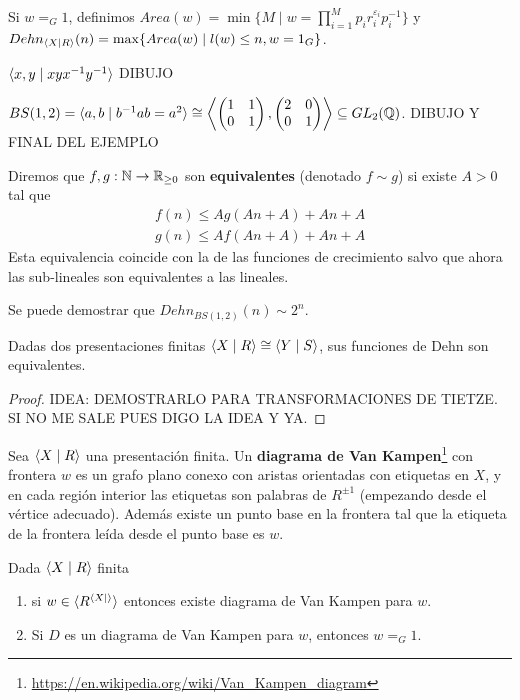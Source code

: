 \documentclass[twoside, 11pt]{article}
\begin{document}
Si $w=_G 1$, definimos $Area(w)=\min\{M\mid w=\prod_{i=1}^M p_ir_i^{\varepsilon_i}p_i^{-1}\}$ y $Dehn_{\langle{X\mid R}\rangle}(n)=\max\{Area(w)\mid l(w)\leq n, w=1_G\}$.

\begin{ej}
$\langle{x,y\mid xyx^{-1}y^{-1}}\rangle$ DIBUJO
\end{ej}

\begin{ej}
$BS(1,2)=\langle{a,b\mid b^{-1}ab=a^2}\rangle\cong\left\langle\begin{pmatrix}
1 & 1\\
0 & 1
\end{pmatrix}, \begin{pmatrix}
2 & 0 \\
0 & 1
\end{pmatrix}\right\rangle\subseteq GL_2(\mathbb{Q})$. DIBUJO Y FINAL DEL EJEMPLO
\end{ej}

Diremos que $f,g:\mathbb{N}\to\mathbb{R}_{\geq 0}$ son \textbf{equivalentes} (denotado $f\sim g$) si existe $A>0$ tal que
\begin{gather*}
f(n)\leq Ag(An+A)+An+A\\
g(n)\leq Af(An+A)+An+A
\end{gather*}
Esta equivalencia coincide con la de las funciones de crecimiento salvo que ahora las sub-lineales son equivalentes a las lineales. 

Se puede demostrar que $Dehn_{BS(1,2)}(n)\sim 2^n$.

\begin{lemma}
Dadas dos presentaciones finitas $\langle{X\mid R}\rangle\cong \langle{Y\mid S}\rangle$, sus funciones de Dehn son equivalentes.
\end{lemma}
\begin{proof}
IDEA: DEMOSTRARLO PARA TRANSFORMACIONES DE TIETZE. SI NO ME SALE PUES DIGO LA IDEA Y YA.
\end{proof}

Sea $\langle{X\mid R}\rangle$ una presentación finita. Un \textbf{diagrama de Van Kampen}\footnote{\url{https://en.wikipedia.org/wiki/Van_Kampen_diagram}} con frontera $w$ es un grafo plano conexo con aristas orientadas con etiquetas en $X$, y en cada región interior las etiquetas son palabras de $R^{\pm 1}$ (empezando desde el vértice adecuado). Además existe un punto base en la frontera tal que la etiqueta de la frontera leída desde el punto base es $w$. 

\begin{teorema}
Dada $\langle{X\mid R}\rangle$ finita
\begin{enumerate}
\item si $w\in \langle{R^{\langle{X\mid }\rangle}}\rangle$ entonces existe diagrama de Van Kampen para $w$.
\item Si $D$ es un diagrama de Van Kampen para $w$, entonces $w=_G 1$.
\end{enumerate}
\end{teorema}
\end{document}

